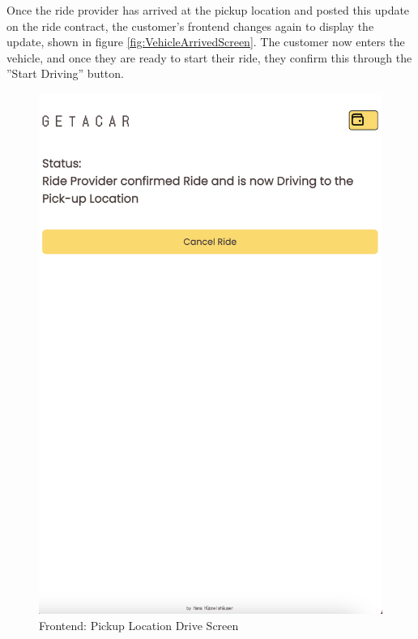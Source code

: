 Once the ride provider has arrived at the pickup location and posted this update on the ride contract, the customer's frontend changes again to display the update, shown in figure \ref{fig:VehicleArrivedScreen}. The customer now enters the vehicle, and once they are ready to start their ride, they confirm this through the ''Start Driving'' button.


\begin{figure}[H]
    \centering
    
    \begin{minipage}{0.45\linewidth}
        \centering
        \includegraphics[width=\linewidth]{data/ffss/7.png}
        \caption{Frontend: Pickup Location Drive Screen}
        \label{fig:PickupLocationDriveScreen}
    \end{minipage}

\end{figure}
